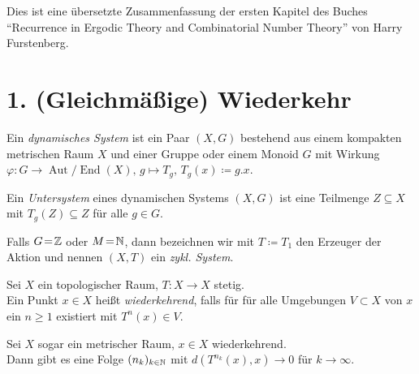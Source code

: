 \documentclass{cheat-sheet}
\DeclareMathOperator{\Aut}{Aut} %
\DeclareMathOperator{\End}{End} %
\newcommand{\AutEnd}{\Aut\!/\!\End} %
\begin{document}


Dies ist eine übersetzte Zusammenfassung der ersten Kapitel des Buches "`Recurrence in Ergodic Theory and Combinatorial Number Theory"' von Harry Furstenberg.


\section{1. (Gleichmäßige) Wiederkehr}


\begin{defn}
  Ein \emph{dynamisches System} ist ein Paar $(X, G)$ bestehend aus einem kompakten metrischen Raum $X$ und einer Gruppe oder einem Monoid $G$ mit Wirkung
  $\varphi : G \to \AutEnd(X), \, g \mapsto T_g, \, T_g(x) \coloneqq g.x$.
\end{defn}

\begin{defn}
  Ein \emph{Untersystem} eines dynamischen Systems $(X, G)$ ist eine Teilmenge $Z \subseteq X$ mit $T_g(Z) \subseteq Z$ für alle $g \in G$.
\end{defn}

\begin{bem}
  Falls $G \!=\! \mathbb{Z}$ oder $M \!=\! \mathbb{N}$, dann bezeichnen wir mit $T \coloneqq T_1$ den Erzeuger der Aktion und nennen $(X, T)$ ein \emph{zykl. System}.
\end{bem}

\begin{defn}
  Sei $X$ ein topologischer Raum, $T : X \to X$ stetig. \\
  Ein Punkt $x \in X$ heißt \emph{wiederkehrend}, falls für für alle Umgebungen $V \subset X$ von $x$ ein $n \geq 1$ existiert mit $T^n(x) \in V$.
\end{defn}

\begin{bem}
  Sei $X$ sogar ein metrischer Raum, $x \in X$ wiederkehrend. \\
  Dann gibt es eine Folge $(n_k)_{k \in \mathbb{N}}$ mit $d(T^{n_k}(x), x) \to 0$ für $k \to \infty$.
\end{bem}
\end{document}
